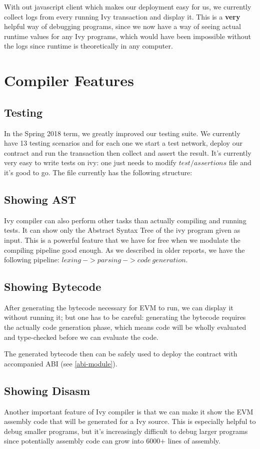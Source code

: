 \documentclass{article}
\begin{document}
\par With out javascript client which makes our deployment easy for us, we currently collect logs from every running Ivy transaction and display it. This is a \textbf{very} helpful way of debugging programs, since we now have a way of seeing actual runtime values for any Ivy programs, which would have been impossible without the logs since runtime is theoretically in any computer.

\section{Compiler Features}
\subsection{Testing}
In the Spring 2018 term, we greatly improved our testing suite. We currently have 13 testing scenarios and for each one we start a test network, deploy our contract and run the transaction then collect and assert the result. It's currently very easy to write tests on ivy: one just needs to modify $test/assertions$ file and it's good to go. The file currently has the following structure:


\newpage
\subsection{Showing AST}
Ivy compiler can also perform other tasks than actually compiling and running tests. It can show only the Abstract Syntax Tree of the ivy program given as input. This is a powerful feature that we have for free when we modulate the compiling pipeline good enough. As we described in older reports, we have the following pipeline: $lexing\ -> parsing\ -> code\ generation$.
\subsection{Showing Bytecode}
After generating the bytecode necessary for EVM to run, we can display it without running it; but one has to be careful: generating the bytecode requires the actually code generation phase, which means code will be wholly evaluated and type-checked before we can evaluate the code.
\par The generated bytecode then can be safely used to deploy the contract with accompanied ABI (see \ref{abi-module}).
\subsection{Showing Disasm}
Another important feature of Ivy compiler is that we can make it show the EVM assembly code that will be generated for a Ivy source. This is especially helpful to debug smaller programs, but it's increasingly difficult to debug larger programs since potentially assembly code can grow into 6000+ lines of assembly.
\end{document}
